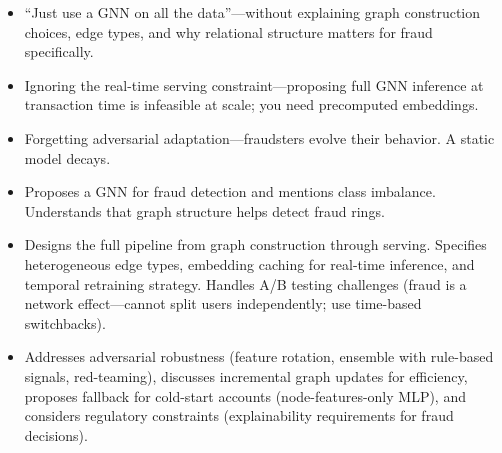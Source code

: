 \begin{interviewq}
\redflags
\begin{itemize}
    \item ``Just use a GNN on all the data''---without explaining graph construction choices, edge types, and why relational structure matters for fraud specifically.
    \item Ignoring the real-time serving constraint---proposing full GNN inference at transaction time is infeasible at scale; you need precomputed embeddings.
    \item Forgetting adversarial adaptation---fraudsters evolve their behavior. A static model decays.
\end{itemize}


\goodgreat
\begin{itemize}
    \item {} Proposes a GNN for fraud detection and mentions class imbalance. Understands that graph structure helps detect fraud rings.
    \item {} Designs the full pipeline from graph construction through serving. Specifies heterogeneous edge types, embedding caching for real-time inference, and temporal retraining strategy. Handles A/B testing challenges (fraud is a network effect---cannot split users independently; use time-based switchbacks).
    \item {} Addresses adversarial robustness (feature rotation, ensemble with rule-based signals, red-teaming), discusses incremental graph updates for efficiency, proposes fallback for cold-start accounts (node-features-only MLP), and considers regulatory constraints (explainability requirements for fraud decisions).
\end{itemize}

\end{interviewq}

